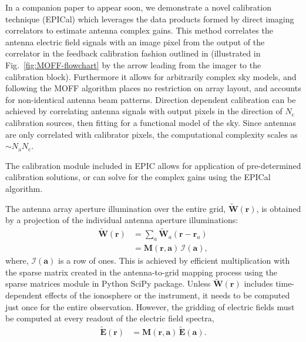 \documentclass[a4paper,fleqn,usenatbib]{mnras}
\begin{document}
In a companion paper to appear soon, we demonstrate a novel calibration 
technique (EPICal) which leverages the data products formed by direct imaging 
correlators to estimate antenna complex gains. This method correlates the antenna 
electric field signals with an image pixel from the output of the correlator in 
the feedback calibration fashion outlined in \citealt{mor11} (illustrated in 
Fig.~\ref{fig:MOFF-flowchart} by the arrow leading from the imager to the 
calibration block). Furthermore it allows for arbitrarily complex sky models, 
and following the MOFF algorithm places no restriction on array layout, and 
accounts for non-identical antenna beam patterns. Direction dependent calibration 
can be achieved by correlating antenna signals with output pixels in the 
direction of $N_\textrm{c}$ calibration sources, then fitting for a functional 
model of the sky. Since antennas are only correlated with calibrator pixels, the 
computational complexity scales as $\sim N_\textrm{a} N_\textrm{c}$. 

The calibration module included in EPIC allows for application of pre-determined 
calibration solutions, or can solve for the complex gains using the EPICal 
algorithm.

\par\medskip
{}
\par\medskip
\noindent The antenna array aperture illumination over the entire grid,
$\widetilde{\mathbf{W}}(\mathbf{r})$, is obtained by a projection of the 
individual antenna aperture illuminations:
\begin{align}\label{eqn:gridding-convolution}
  \widetilde{\mathbf{W}}(\mathbf{r}) &= \sum_a \widetilde{\mathbf{W}}_a(\mathbf{r}-\mathbf{r}_a) \\
                            &= \mathbf{M}(\mathbf{r},\mathbf{a})\,\mathcal{I}(\mathbf{a}),
\end{align}
where, $\mathcal{I}(\mathbf{a})$ is a row of ones. This is achieved by
efficient multiplication with the sparse matrix created in the antenna-to-grid
mapping process using the sparse matrices module in Python SciPy package. 
Unless $\widetilde{\mathbf{W}}(\mathbf{r})$ includes time-dependent
effects of the ionosphere or the instrument, it needs to be computed just once
for the entire observation. However, the gridding of electric fields must be
computed at every readout of the electric field spectra,
\begin{align}
  \widetilde{\mathbf{E}}(\mathbf{r}) &= \mathbf{M}(\mathbf{r},\mathbf{a})\,\widetilde{\mathbf{E}}(\mathbf{a}).
\end{align}
\end{document}
